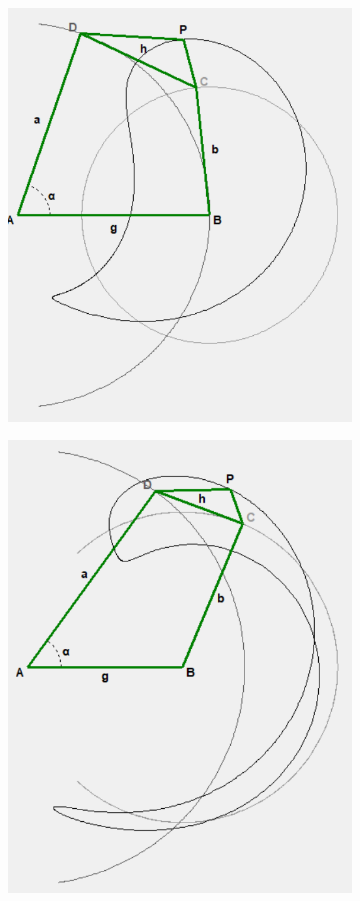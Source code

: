 \documentclass{article}
\begin{document}
\begin{figure}[h]
\begin{subfigure}{0.19\textwidth}
		\caption{}
	\end{subfigure}
	\hfill
	\begin{subfigure}{0.19\textwidth}
		\centering
		\includegraphics[width=\linewidth, height=0.95\linewidth, keepaspectratio]{./Figures/27_motion_cases/00-1.png}
		\caption{}
	\end{subfigure}
	\hfill
	\begin{subfigure}{0.19\textwidth}
		\centering
		\includegraphics[width=\linewidth, height=0.95\linewidth, keepaspectratio]{./Figures/27_motion_cases/-10-1.png}

\end{subfigure}
\end{figure}
\end{document}
